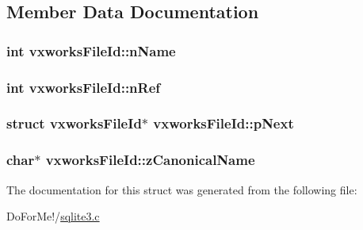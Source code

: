 \subsection{Member Data Documentation}
\hypertarget{structvxworks_file_id_af7ed9a749d73b74b534bc06baf1abf6d}{
\subsubsection[{n\-Name}]{\setlength{\rightskip}{0pt plus 5cm}int vxworks\-File\-Id\-::n\-Name}}\label{structvxworks_file_id_af7ed9a749d73b74b534bc06baf1abf6d}
\hypertarget{structvxworks_file_id_a59dde49ee027786a06de8ad59b1d7883}{
\subsubsection[{n\-Ref}]{\setlength{\rightskip}{0pt plus 5cm}int vxworks\-File\-Id\-::n\-Ref}}\label{structvxworks_file_id_a59dde49ee027786a06de8ad59b1d7883}
\hypertarget{structvxworks_file_id_a1941104384e7aa1ad9d8574d091abe3a}{
\subsubsection[{p\-Next}]{\setlength{\rightskip}{0pt plus 5cm}struct {\bf vxworks\-File\-Id}$\ast$ vxworks\-File\-Id\-::p\-Next}}\label{structvxworks_file_id_a1941104384e7aa1ad9d8574d091abe3a}
\hypertarget{structvxworks_file_id_a032c9aaaa13ff100d9f3cd53926587fe}{
\subsubsection[{z\-Canonical\-Name}]{\setlength{\rightskip}{0pt plus 5cm}char$\ast$ vxworks\-File\-Id\-::z\-Canonical\-Name}}\label{structvxworks_file_id_a032c9aaaa13ff100d9f3cd53926587fe}


The documentation for this struct was generated from the following file\-:\begin{DoxyCompactItemize}
\item 
Do\-For\-Me!/\hyperlink{sqlite3_8c}{sqlite3.\-c}\end{DoxyCompactItemize}
